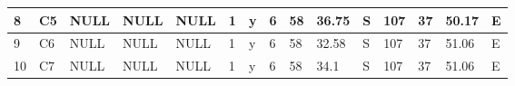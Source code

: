 {\begin{table}[]
\begin{tabular}{|l|l|l|l|l|l|l|l|l|l|l|l|l|l|l|}
		8                                 & C5                                        & NULL                                      & NULL                            & NULL                            & 1                               & y                                    & 6                                                                                    & 58                                                                                   & 36.75                                                                                & S                                                                                 & 107                                                                                   & 37                                                                                    & 50.17                                                                                 & E                                                                                  \\ \hline
		9                                 & C6                                        & NULL                                      & NULL                            & NULL                            & 1                               & y                                    & 6                                                                                    & 58                                                                                   & 32.58                                                                                & S                                                                                 & 107                                                                                   & 37                                                                                    & 51.06                                                                                 & E                                                                                  \\ \hline
		10                                & C7                                        & NULL                                      & NULL                            & NULL                            & 1                               & y                                    & 6                                                                                    & 58                                                                                   & 34.1                                                                                 & S                                                                                 & 107                                                                                   & 37                                                                                    & 51.06                                                                                 & E                                                                                  \\ \hline

\end{tabular}
\end{table}}
